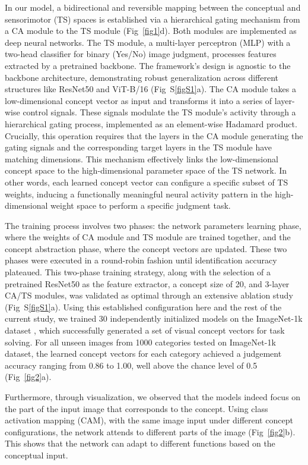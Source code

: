 \documentclass[pdflatex,sn-mathphys-num,lineno]{sn-jnl}%
\begin{document}
\begin{CJK}{UTF8}{gbsn}
In our model, a bidirectional and reversible mapping between the conceptual and sensorimotor (TS) spaces is established via a hierarchical gating mechanism from a CA module to the TS module (Fig~\ref{fig1}d). Both modules are implemented as deep neural networks. The TS module, a multi-layer perceptron (MLP) with a two-head classifier for binary (Yes/No) image judgment, processes features extracted by a pretrained backbone. The framework's design is agnostic to the backbone architecture, demonstrating robust generalization across different structures like ResNet50 \cite{he_deep_2016} and ViT-B/16 \cite{dosovitskiy_image_2021} (Fig~S\ref{figS1}a). The CA module takes a low-dimensional concept vector as input and transforms it into a series of layer-wise control signals. These signals modulate the TS module's activity through a hierarchical gating process, implemented as an element-wise Hadamard product. Crucially, this operation requires that the layers in the CA module generating the gating signals and the corresponding target layers in the TS module have matching dimensions. This mechanism effectively links the low-dimensional concept space to the high-dimensional parameter space of the TS network. In other words, each learned concept vector can configure a specific subset of TS weights, inducing a functionally meaningful neural activity pattern in the high-dimensional weight space to perform a specific judgment task.

The training process involves two phases: the network parameters learning phase, where the weights of CA module and TS module are trained together, and the concept abstraction phase, where the concept vectors are updated. These two phases were executed in a round-robin fashion until identification accuracy plateaued. This two-phase training strategy, along with the selection of a pretrained ResNet50 as the feature extractor, a concept size of 20, and 3-layer CA/TS modules, was validated as optimal through an extensive ablation study (Fig~S\ref{figS1}a). Using this established configuration here and the rest of the current study, we trained 30 independently initialized models on the ImageNet-1k dataset \cite{deng_imagenet_2009}, which successfully generated a set of visual concept vectors for task solving. For all unseen images from 1000 categories tested on ImageNet-1k dataset, the learned concept vectors for each category achieved a judgement accuracy ranging from 0.86 to 1.00, well above the chance level of 0.5 (Fig~\ref{fig2}a).

Furthermore, through visualization, we observed that the models indeed focus on the part of the input image that corresponds to the concept. Using class activation mapping (CAM), with the same image input under different concept configurations, the network attends to different parts of the image (Fig~\ref{fig2}b). This shows that the network can adapt to different functions based on the conceptual input.


\end{CJK}
\end{document}

